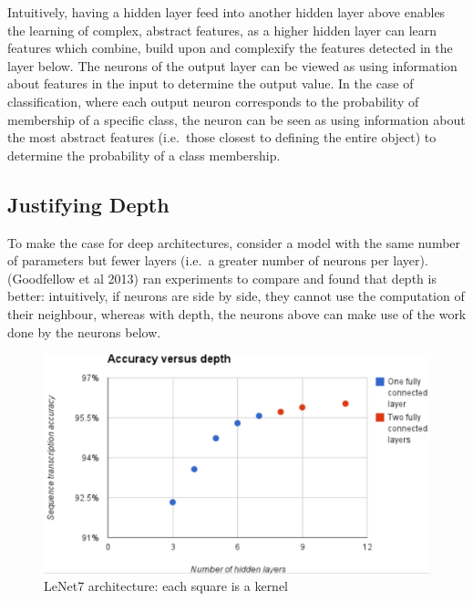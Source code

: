\documentclass[a4paper,11pt]{article}
\begin{document}
Intuitively, having a hidden layer feed into another hidden layer above enables the learning of complex, abstract features, as a higher hidden layer can learn features which combine, build upon and complexify the features detected in the layer below. The neurons of the output layer can be viewed as using information about features in the input to determine the output value. In the case of classification, where each output neuron corresponds to the probability of membership of a specific class, the neuron can be seen as using information about the most abstract features (i.e.\ those closest to defining the entire object) to determine the probability of a class membership. \\

\subsection{Justifying Depth}

To make the case for deep architectures, consider a model with the same number of parameters but fewer layers (i.e.\ a greater number of neurons per layer). (Goodfellow et al 2013) \cite{goodfellow_street_view} ran experiments to compare and found that depth is better: intuitively, if neurons are side by side, they cannot use the computation of their neighbour, whereas with depth, the neurons above can make use of the work done by the neurons below. \\	

\begin{figure}[h!]
	\centering
	\includegraphics[scale=0.3]{images/more_layers_better.png}
	\caption{LeNet7 architecture: each square is a kernel}
\end{figure}
\end{document}

